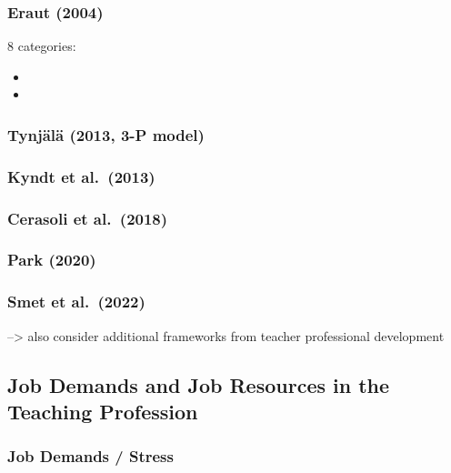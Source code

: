 \documentclass[
]{article}
\providecommand{\tightlist}{%
  \setlength{\itemsep}{0pt}\setlength{\parskip}{0pt}}
\begin{document}
\subsubsection{Eraut (2004)}\label{eraut-2004}

8 categories:

\begin{itemize}
\tightlist
\item
\item
\end{itemize}

\subsubsection{Tynjälä (2013, 3-P
model)}\label{tynjuxe4luxe4-2013-3-p-model}

\subsubsection{Kyndt et al.~(2013)}\label{kyndt-et-al.-2013}

\subsubsection{Cerasoli et al.~(2018)}\label{cerasoli-et-al.-2018}

\subsubsection{Park (2020)}\label{park-2020}

\subsubsection{Smet et al.~(2022)}\label{smet-et-al.-2022}

--\textgreater{} also consider additional frameworks from teacher
professional development

\subsection{Job Demands and Job Resources in the Teaching
Profession}\label{job-demands-and-job-resources-in-the-teaching-profession}

\subsubsection{Job Demands / Stress}\label{job-demands-stress}
\end{document}
